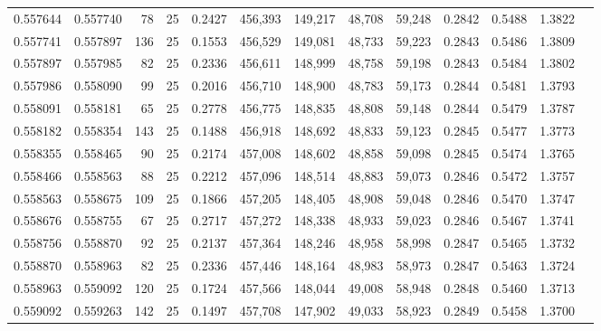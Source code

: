 \begin{tabular}{rrrrrrrrrrrrr}
0.557644 & 0.557740 &    78 &  25 &                                     0.2427 & 456,393 & 149,217 &  48,708 &  59,248 & 0.2842 & 0.5488 & 1.3822 \\
0.557741 & 0.557897 &   136 &  25 &                                     0.1553 & 456,529 & 149,081 &  48,733 &  59,223 & 0.2843 & 0.5486 & 1.3809 \\
0.557897 & 0.557985 &    82 &  25 &                                     0.2336 & 456,611 & 148,999 &  48,758 &  59,198 & 0.2843 & 0.5484 & 1.3802 \\
0.557986 & 0.558090 &    99 &  25 &                                     0.2016 & 456,710 & 148,900 &  48,783 &  59,173 & 0.2844 & 0.5481 & 1.3793 \\
0.558091 & 0.558181 &    65 &  25 &                                     0.2778 & 456,775 & 148,835 &  48,808 &  59,148 & 0.2844 & 0.5479 & 1.3787 \\
0.558182 & 0.558354 &   143 &  25 &                                     0.1488 & 456,918 & 148,692 &  48,833 &  59,123 & 0.2845 & 0.5477 & 1.3773 \\
0.558355 & 0.558465 &    90 &  25 &                                     0.2174 & 457,008 & 148,602 &  48,858 &  59,098 & 0.2845 & 0.5474 & 1.3765 \\
0.558466 & 0.558563 &    88 &  25 &                                     0.2212 & 457,096 & 148,514 &  48,883 &  59,073 & 0.2846 & 0.5472 & 1.3757 \\
0.558563 & 0.558675 &   109 &  25 &                                     0.1866 & 457,205 & 148,405 &  48,908 &  59,048 & 0.2846 & 0.5470 & 1.3747 \\
0.558676 & 0.558755 &    67 &  25 &                                     0.2717 & 457,272 & 148,338 &  48,933 &  59,023 & 0.2846 & 0.5467 & 1.3741 \\
0.558756 & 0.558870 &    92 &  25 &                                     0.2137 & 457,364 & 148,246 &  48,958 &  58,998 & 0.2847 & 0.5465 & 1.3732 \\
0.558870 & 0.558963 &    82 &  25 &                                     0.2336 & 457,446 & 148,164 &  48,983 &  58,973 & 0.2847 & 0.5463 & 1.3724 \\
0.558963 & 0.559092 &   120 &  25 &                                     0.1724 & 457,566 & 148,044 &  49,008 &  58,948 & 0.2848 & 0.5460 & 1.3713 \\
0.559092 & 0.559263 &   142 &  25 &                                     0.1497 & 457,708 & 147,902 &  49,033 &  58,923 & 0.2849 & 0.5458 & 1.3700 \\

\end{tabular}
